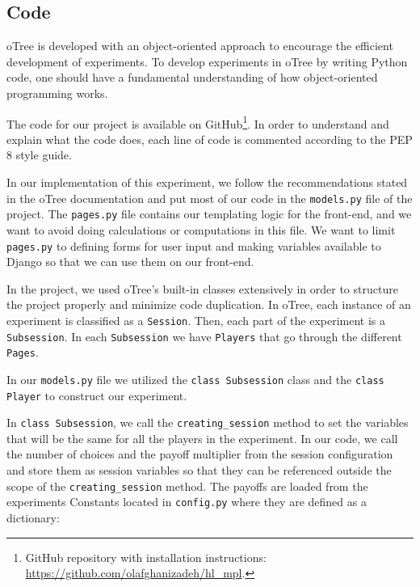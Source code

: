 \documentclass [12pt,a4paper,oneside]{article}
\begin{document}
\subsection{Code}

oTree is developed with an object-oriented approach to encourage the efficient development of experiments. To develop experiments in oTree by writing Python code, one should have a fundamental understanding of how object-oriented programming works. 

The code for our project is available on GitHub\footnote{GitHub repository with installation instructions: \url{https://github.com/olafghanizadeh/hl_mpl}.}. In order to understand and explain what the code does, each line of code is commented according to the PEP 8 style guide. 



In our implementation of this experiment, we follow the recommendations stated in the oTree documentation and put most of our code in the \texttt{models.py} file of the project. The \texttt{pages.py} file contains our templating logic for the front-end, and we want to avoid doing calculations or computations in this file. We want to limit \texttt{pages.py} to defining forms for user input and making variables available to Django so that we can use them on our front-end. 

In the project, we used oTree's built-in classes extensively in order to structure the project properly and minimize code duplication. In oTree, each instance of an experiment is classified as a \texttt{Session}. Then, each part of the experiment is a \texttt{Subsession}. In each \texttt{Subsession} we have \texttt{Players} that go through the different \texttt{Pages}.

In our \texttt{models.py} file we utilized the \texttt{class Subsession} class and the \texttt{class Player} to construct our experiment. 

In \texttt{class Subsession}, we call the \texttt{creating_session} method to set the variables that will be the same for all the players in the experiment. In our code, we call the number of choices and the payoff multiplier from the session configuration and store them as session variables so that they can be referenced outside the scope of the \texttt{creating_session} method. The payoffs are loaded from the experiments Constants located in \texttt{config.py} where they are defined as a dictionary:
\end{document}
